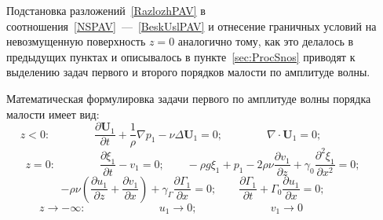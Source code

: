 Подстановка разложений~\eqref{RazlozhPAV} в соотношения~\eqref{NSPAV}~---~\eqref{BeskUslPAV} и отнесение граничных условий на невозмущенную поверхность $ z=0 $ аналогично тому, как это делалось в предыдущих пунктах и описывалось в пункте~\ref{sec:ProcSnos} приводят к выделению задач первого и второго порядков малости по амплитуде волны. 

Математическая формулировка задачи первого по амплитуде волны порядка малости имеет вид:
\begin{equation}
z<0: \qquad \qquad \dfrac{\partial \mathbf{U}_{1}}{\partial t}+\dfrac{1}{\rho} \nabla p_{1}-\nu \Delta \mathbf{U}_{1}=0; \qquad \qquad \nabla \cdot \mathbf{U}_{1}=0; \qquad \qquad \qquad \label{NSPAV1}
\end{equation}
\begin{equation}
z=0:\mspace{72mu} \dfrac{\partial \xi_{1}}{\partial t}-v_{1}=0;\qquad -\rho g \xi_{1}+p_{1}-2 \rho \nu \dfrac{\partial v_{1}}{\partial z}+\gamma_{0} \dfrac{\partial^{2}\xi_{1}}{\partial x^{2}}=0;\mspace{36mu}
 \label{GU1PAV1}
\end{equation}
\begin{equation}
-\rho \nu \left( \dfrac{\partial u_{1}}{\partial z} +\dfrac{\partial v_{1}}{\partial x} \right) +\gamma_{\Gamma} \dfrac{\partial \Gamma_{1}}{\partial x}=0; \qquad \dfrac{\partial \Gamma_{1}}{\partial t}+\Gamma_{0} \dfrac{\partial u_{1}}{\partial x}=0; \qquad
 \label{GU2PAV1}
\end{equation}
\begin{equation}
z \rightarrow - \infty:\mspace{120mu} u_{1} \rightarrow 0; \mspace{120mu} v_{1} \rightarrow 0 \mspace{108mu} \label{BeskUslPAV1}
\end{equation}

